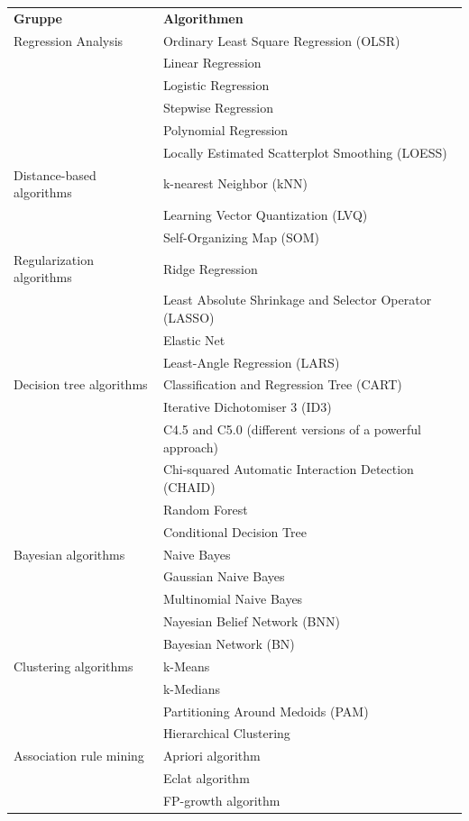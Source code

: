 \begin{table}[H] \centering
\tiny
\begin{tabular}{|l|l|}
\hline
\textbf{Gruppe} & \textbf{Algorithmen}\\ 
\hhline{==}
Regression Analysis & Ordinary Least Square Regression (OLSR)\\
& Linear Regression\\
& Logistic Regression\\
& Stepwise Regression\\
& Polynomial Regression\\
& Locally Estimated Scatterplot Smoothing (LOESS)\\
\hline
Distance-based algorithms & k-nearest Neighbor (kNN)\\
& Learning Vector Quantization (LVQ)\\
& Self-Organizing Map (SOM)\\
\hline
Regularization algorithms & Ridge Regression\\
& Least Absolute Shrinkage and Selector Operator (LASSO)\\
& Elastic Net\\
& Least-Angle Regression (LARS)\\
\hline
Decision tree algorithms & Classification and Regression Tree (CART)\\
& Iterative Dichotomiser 3 (ID3)\\
& C4.5 and C5.0 (different versions of a powerful approach)\\
& Chi-squared Automatic Interaction Detection (CHAID)\\
& Random Forest\\
& Conditional Decision Tree\\
\hline
Bayesian algorithms & Naive Bayes\\
& Gaussian Naive Bayes\\
& Multinomial Naive Bayes\\
& Nayesian Belief Network (BNN)\\
& Bayesian Network (BN)\\
\hline
Clustering algorithms & k-Means\\
& k-Medians\\
& Partitioning Around Medoids (PAM)\\
& Hierarchical Clustering\\
\hline
Association rule mining & Apriori algorithm\\
& Eclat algorithm\\
& FP-growth algorithm\\

\end{tabular}
\end{table}
